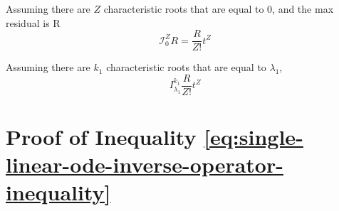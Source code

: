 \documentclass[accepted]{uai2023}
\newcommand{\I}{\mathcal{I}}
\begin{document}
    Assuming there  are $Z$ characteristic roots that are equal to $0$, and the max residual is R
    \begin{equation}
        \I_0^Z R = \frac{R}{Z!} t^Z
    \end{equation}

    Assuming there are $k_1$ characteristic roots that are equal to $\lambda_{1}$,
    \begin{equation}
        I_{\lambda_1}^{k_1} \frac{R}{Z!} t^Z
    \end{equation}

\section{Proof of Inequality \ref{eq:single-linear-ode-inverse-operator-inequality}} \label{appendix:inequality-proof-inverse-operator-chain}
\end{document}
